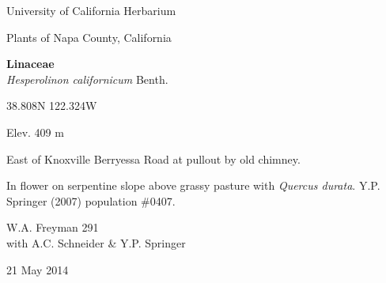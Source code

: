 \documentclass[letterpaper,10pt]{article}
\begin{document}
\begin{minipage}[t]{0.40\textwidth}

\begin{center}
University of California Herbarium \\
\begin{large}
Plants of Napa County, California \\
\end{large}
\vspace{\baselineskip}
\textbf{Linaceae} \\
\textit{Hesperolinon californicum} Benth.\\
\end{center}

\begin{footnotesize}

\begin{multicols}{2}
38.808\textdegree N 122.324\textdegree W
\columnbreak
\begin{flushright}
Elev. 409 m
\end{flushright}
\end{multicols}

East of Knoxville Berryessa Road at pullout by old chimney.
\vspace{\baselineskip}

In flower on serpentine slope above grassy pasture with \textit{Quercus durata}. Y.P. Springer (2007) population \#0407.

\begin{multicols}{2}
W.A. Freyman 291 \\
with A.C. Schneider \& Y.P. Springer
\columnbreak
\begin{flushright}
21 May 2014
\end{flushright}
\end{multicols}

\end{footnotesize}

\end{minipage}

\vspace{2cm}
%
%

%
%
\end{document}
